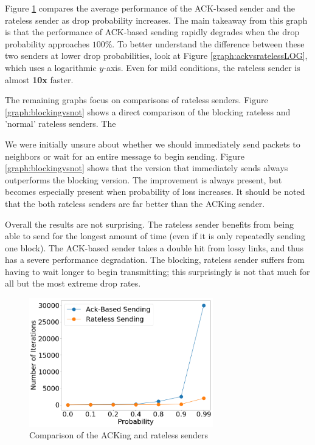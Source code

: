 Figure \ref{graph:ackvsrateless} compares the average performance of the ACK-based sender and the rateless sender as drop probability increases. The main takeaway from this graph is that the performance of ACK-based sending rapidly degrades when the drop probability approaches $100\%$. To better understand the difference between these two senders at lower drop probabilities, look at Figure \ref{graph:ackvsratelessLOG}, which uses a logarithmic $y$-axis. Even for mild conditions, the rateless sender is almost \textbf{10x} faster. 

The remaining graphs focus on comparisons of rateless senders. Figure \ref{graph:blockingvsnot} shows a direct comparison of the blocking rateless and 'normal' rateless senders. The 

We were initially unsure about whether we should immediately send packets to neighbors or wait for an entire message to begin sending. Figure \ref{graph:blockingvsnot} shows that the version that immediately sends always outperforms the blocking version. The improvement is always present, but becomes especially present when probability of loss increases. It should be noted that the both rateless senders are far better than the ACKing sender.

Overall the results are not surprising. The rateless sender benefits from being able to send for the longest amount of time (even if it is only repeatedly sending one block). The ACK-based sender takes a double hit from lossy links, and thus has a severe performance degradation. The blocking, rateless sender suffers from having to wait longer to begin transmitting; this surprisingly is not that much for all but the most extreme drop rates.

\begin{figure}[tp]
\centering
\noindent
\includegraphics[width=8cm]{figures/ACK_RATELESS_FINAL.png}
\caption{Comparison of the ACKing and rateless senders}
\label{graph:ackvsrateless}
\end{figure}

